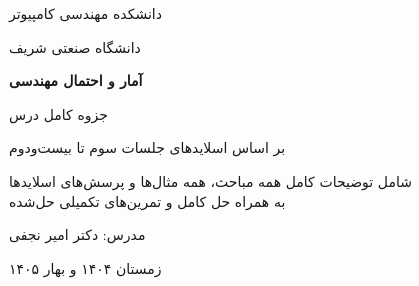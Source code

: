 \begin{titlepage}
\centering
\vspace*{1.5cm}
{\large دانشکده مهندسی کامپیوتر\par}
{\large دانشگاه صنعتی شریف\par}
\vspace{2.5cm}
{\fontsize{34}{48}\selectfont\bfseries آمار و احتمال مهندسی\par}
\vspace{0.8cm}
{\Large جزوه کامل درس\par}
\vspace{0.4cm}
{\large بر اساس اسلایدهای جلسات سوم تا بیست‌ودوم\par}
\vspace{2cm}
\begin{tcolorbox}[enhanced,colback=defcol!5,colframe=defcol,width=0.75\textwidth,arc=3mm,halign=center]
شامل توضیحات کامل همه مباحث، همه مثال‌ها و پرسش‌های اسلایدها\\
به همراه حل کامل و تمرین‌های تکمیلی حل‌شده
\end{tcolorbox}
\vfill
{\large مدرس: دکتر امیر نجفی\par}
\vspace{0.3cm}
{زمستان ۱۴۰۴ و بهار ۱۴۰۵\par}
\vspace{1cm}
\end{titlepage}
